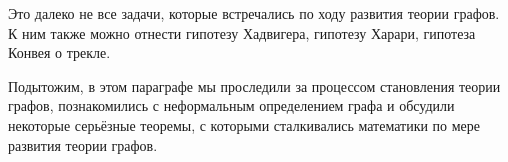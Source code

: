 	Это далеко не все задачи, которые встречались по ходу развития теории графов. К ним также можно отнести гипотезу Хадвигера, гипотезу Харари, гипотеза Конвея о трекле.
	
	Подытожим, в этом параграфе мы проследили за процессом становления теории графов, познакомились с неформальным определением графа и обсудили некоторые серьёзные теоремы, с которыми сталкивались математики по мере развития теории графов.